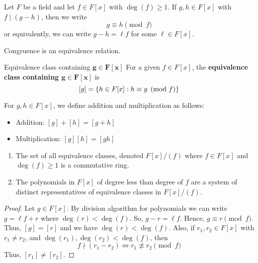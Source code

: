 \begin{Definition}{}{}
    Let $ F $ be a field and let $ f\in F[x] $ with $ \deg(f)\geqslant 1 $.
    If $ g,h\in F[x] $ with $ f\mid (g-h) $, then we write
    \[ g\equiv h \pmod{f} \]
    or equivalently, we can write $ g-h=\ell f $ for some $ \ell\in F[x] $.
\end{Definition}

\begin{Theorem}{}{}
    Congruence is an equivalence relation.
\end{Theorem}

\begin{Definition}{Equivalence class containing $\bm{g\in F[x]}$}{}
    For a given $ f\in F[x] $, the \textbf{equivalence class containing $\bm{g\in F[x]}$}
    is
    \[ [g]=\{h\in F[x]: h\equiv g\pmod{f}\} \]
\end{Definition}

\begin{Definition}{}{}
    For $ g,h\in F[x] $, we define addition and multiplication as follows:
    \begin{itemize}
        \item Addition: $ [g]+[h]=[g+h] $
        \item Multiplication: $ [g][h]=[gh] $
    \end{itemize}
\end{Definition}

\begin{Theorem}{}{}
    \begin{enumerate}[label=(\arabic*)]
        \item The set of all equivalence classes, denoted $ F[x]/(f) $
              where $ f\in F[x] $ and $ \deg(f)\geqslant 1 $ is a
              commutative ring.
        \item The polynomials in $ F[x] $ of degree less than degree of $ f $
              are a system of distinct representatives of equivalence classes in
              $ F[x]/(f)$.
    \end{enumerate}
\end{Theorem}

\begin{proof}
    Let $ g\in F[x] $. By division algorithm for polynomials we can write
    $ g=\ell f+r $ where $ \deg(r)<\deg(f) $. So, $ g-r=\ell f $. Hence,
    $ g\equiv r\pmod{f} $. Thus, $ [g]=[r] $ and we have $ \deg(r)<\deg(f) $.
    Also, if $ r_1,r_2\in F[x] $ with $ r_1\neq r_2 $, and
    $ \deg(r_1),\deg(r_2)<\deg(f) $, then
    \[ f\nmid (r_1-r_2)\iff r_1\not\equiv r_2\pmod{f} \]
    Thus, $ [r_1]\neq [r_2] $.
\end{proof}
